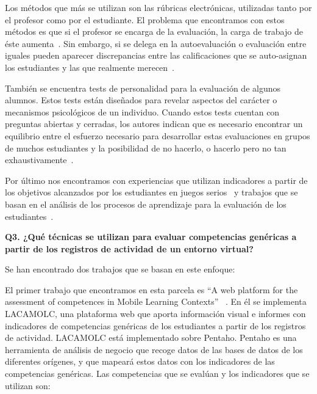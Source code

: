 Los métodos que más se utilizan son las rúbricas electrónicas, utilizadas tanto por el profesor como por el estudiante. El problema que encontramos con estos métodos es que si el profesor se encarga de la evaluación, la carga de trabajo de éste aumenta~\cite{lacuesta2009active,barbera2011design}. Sin embargo, si se delega en la autoevaluación o evaluación entre iguales pueden aparecer discrepancias entre las calificaciones que se auto-asignan los estudiantes y las que realmente merecen~\cite{carreras2013promotion}. 

También se encuentra tests de personalidad para la evaluación de algunos alumnos. Estos tests están diseñados para revelar aspectos del carácter o mecanismos psicológicos de un individuo. Cuando estos tests cuentan con preguntas abiertas y cerradas, los autores indican que es necesario encontrar un equilibrio entre el esfuerzo necesario para desarrollar estas evaluaciones en grupos de muchos estudiantes y la posibilidad de no hacerlo, o hacerlo pero no tan exhaustivamente~\cite{vizcarro2013assessment}.

Por último nos encontramos con experiencias que utilizan indicadores a partir de los objetivos alcanzados por los estudiantes en juegos serios~\cite{djaouti2011classifying,bedek2011behavioral} y trabajos que se basan en el análisis de los procesos de aprendizaje para la evaluación de los estudiantes~\cite{rayon2014web,fidalgo:2015}.

\bigskip
\textbf{Q3. ¿Qué técnicas se utilizan para evaluar competencias genéricas a partir de los registros de actividad de un entorno virtual?}

Se han encontrado dos trabajos que se basan en este enfoque:

\bigskip
El primer trabajo que encontramos en esta parcela es “A web platform for the assessment of competences in Mobile Learning Contexts” ~\cite{rayon2014web}. En él se implementa LACAMOLC, una plataforma web que aporta información visual e informes con indicadores de competencias genéricas de los estudiantes a partir de los registros de actividad. LACAMOLC está implementado sobre Pentaho. Pentaho es una herramienta de análisis de negocio que recoge datos de las bases de datos de los diferentes orígenes, y que mapeará estos datos con los indicadores de las competencias genéricas. Las competencias que se evalúan y los indicadores que se utilizan son:

